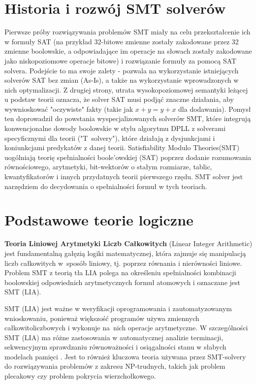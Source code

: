 \section{Historia i rozwój SMT solverów}
Pierwsze próby rozwiązywania problemów SMT miały na celu przekształcenie ich w formuły SAT (na przykład 32-bitowe zmienne zostały zakodowane przez 32 zmienne boolowskie, a odpowiadające im operacje na słowach zostały zakodowane jako niskopoziomowe operacje bitowe) i rozwiązanie formuły za pomocą SAT solvera. Podejście to ma swoje zalety - pozwala na wykorzystanie istniejących solverów SAT bez zmian (As-Is), a także na wykorzystanie wprowadzonych w nich optymalizacji. Z drugiej strony, utrata wysokopoziomowej semantyki leżącej u podstaw teorii oznacza, że solver SAT musi podjąć znaczne działania, aby wywnioskować "oczywiste" fakty (takie jak $x + y = y + x$ dla dodawania). Pomysł ten doprowadził do powstania wyspecjalizowanych solverów SMT, które integrują konwencjonalne dowody boolowskie w stylu algorytmu DPLL z solverami specyficznymi dla teorii ("T~solvery"), które działają z dysjunkcjami i koniunkcjami predykatów z danej teorii. 
Satisfiability Modulo Theories(SMT) uogólniają teorię spełnialności boole'owskiej (SAT) poprzez dodanie rozumowania równościowego, arytmetyki, bit-wektorów o stałym rozmiarze, tablic, kwantyfikatorów i innych przydatnych teorii pierwszego rzędu.
SMT solver jest narzędziem do decydowania o spełnialności formuł w tych teoriach. 

\section{Podstawowe teorie logiczne}

\textbf{Teoria Liniowej Arytmetyki Liczb Całkowitych} (Linear Integer Arithmetic) jest fundamentalną gałęzią logiki matematycznej, która zajmuje się manipulacją liczb całkowitych w~sposób liniowy, tj. poprzez równania i nierówności liniowe. Problem SMT z teorią tła LIA polega na określeniu spełnialności kombinacji boolowskiej odpowiednich arytmetycznych formuł atomowych i oznaczane jest SMT (LIA). 

SMT (LIA) jest ważne w weryfikacji oprogramowania i zautomatyzowanym wnioskowaniu, ponieważ większość programów używa zmiennych całkowitoliczbowych i wykonuje na~nich operacje arytmetyczne. W szczególności SMT (LIA) ma różne zastosowania w automatycznej analizie terminacji, sekwencyjnym sprawdzaniu równoważności i osiągalności stanu w słabych modelach pamięci \cite{CaiLZ22}. Jest to również kluczowa teoria używana przez SMT-solvery do rozwiązywania problemów z zakresu NP-trudnych, takich jak problem plecakowy czy problem pokrycia wierzchołkowego.


